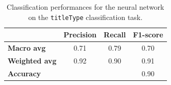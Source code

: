 
\begin{table}[H]

    \centering
    \begin{tabular}{lccc}
    \hline
     & \textbf{Precision} & \textbf{Recall} & \textbf{F1-score}\\
    \hline
    \textbf{Macro avg}   & 0.71 & 0.79 & 0.70 \\
    \textbf{Weighted avg}& 0.92 & 0.90 & 0.91 \\
    \hline
    \textbf{Accuracy}    & & & 0.90 \\
    \hline
    \end{tabular}
    \caption{Classification performances for the neural network on the \texttt{titleType} classification task.}
    \label{tab:nn_report_titletype}
\end{table}


